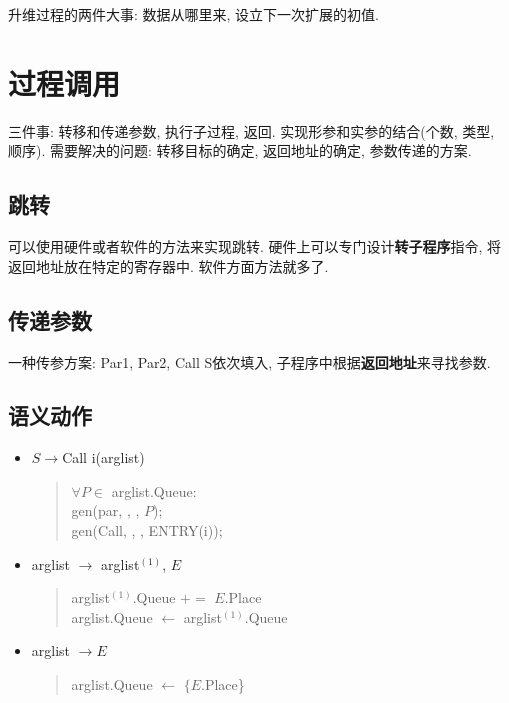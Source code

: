                     升维过程的两件大事: 数据从哪里来, 设立下一次扩展的初值.

    \section{过程调用}

        三件事: 转移和传递参数, 执行子过程, 返回. 实现形参和实参的结合(个数, 类型, 顺序). 需要解决的问题: 转移目标的确定, 返回地址的确定, 参数传递的方案.

        \subsection{跳转}
            
            可以使用硬件或者软件的方法来实现跳转. 硬件上可以专门设计\textbf{转子程序}指令, 将返回地址放在特定的寄存器中. 软件方面方法就多了.
        
        \subsection{传递参数}

            一种传参方案: Par1, Par2, Call S依次填入, 子程序中根据\textbf{返回地址}来寻找参数.

        \subsection{语义动作}

            \begin{itemize}
                \item $S\to $Call i(arglist)
                    \begin{verse}
                        $\forall P\in$ arglist.Queue: \\
                        \qquad gen(par, \uline\quad, \uline\quad, $P$); \\
                        gen(Call, \uline\quad, \uline\quad, ENTRY(i));
                    \end{verse}
                \item arglist $\to$ arglist$^{(1)}$, $E$
                    \begin{verse}
                        arglist$^{(1)}$.Queue $+=$ $E$.Place \\
                        arglist.Queue $\gets$ arglist$^{(1)}$.Queue 
                    \end{verse}
                \item arglist $\to E$
                    \begin{verse}
                        arglist.Queue $\gets$ $\{E$.Place\} \\
                    \end{verse}
            \end{itemize}

